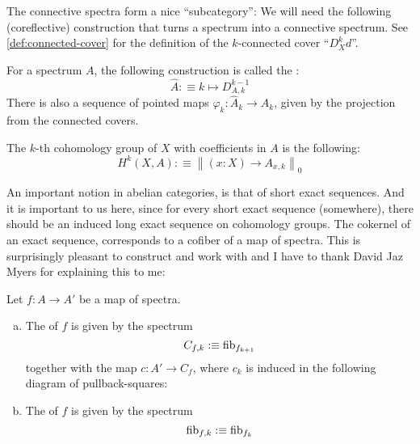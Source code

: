 The connective spectra form a nice ``subcategory'':
We will need the following (coreflective) construction that turns a spectrum into a connective spectrum.
See \cref{def:connected-cover} for the definition of the $k$-connected cover ``$D^k_Xd$''.

\begin{definition}
  For a spectrum $A$,
  the following construction is called the :
  \[ \hat{A}:\equiv k\mapsto D_{A,k}^{k-1}\]
  There is also a sequence of pointed maps $\varphi_k:\hat{A}_k\to A_k$, given by the projection from the connected covers.
\end{definition}

\begin{definition}
  The $k$-th cohomology group of $X$ with coefficients in $A$ is the following:
  \[ H^k(X,A):\equiv\left\|(x:X)\to A_{x,k}\right\|_0 \]
\end{definition}

An important notion in abelian categories, is that of short exact sequences.
And it is important to us here, since for every short exact sequence (somewhere), there should be an induced long exact sequence on cohomology groups.
The cokernel of an exact sequence, corresponds to a cofiber of a map of spectra.
This is surprisingly pleasant to construct and work with and I have to thank David Jaz Myers for explaining this to me:

\begin{definition}
  Let $f:A\to A'$ be a map of spectra.
  \begin{enumerate}[(a)]
  \item The  of $f$ is given by the spectrum
    \[ C_{f,k}:\equiv \mathrm{fib}_{f_{k+1}}\]
    together with the map $c:A'\to C_f$, where $c_k$ is induced in the following diagram of pullback-squares:
    \begin{center}
    \end{center}
  \item The  of $f$ is given by the spectrum
    \[ \mathrm{fib}_{f,k}:\equiv \mathrm{fib}_{f_k}\]
  \end{enumerate}
\end{definition}

